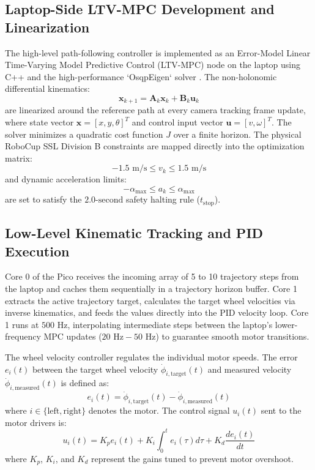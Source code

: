 \documentclass[a4paper,twoside,12pt]{report}
\begin{document}
\subsection{Laptop-Side LTV-MPC Development and Linearization}

The high-level path-following controller is implemented as an Error-Model Linear Time-Varying Model Predictive Control (LTV-MPC) node on the laptop using C++ and the high-performance `OsqpEigen` solver \citep{pacheco2015testing,stellato2020osqp}. The non-holonomic differential kinematics:
\begin{equation}
\mathbf{x}_{k+1} = \mathbf{A}_k \mathbf{x}_k + \mathbf{B}_k \mathbf{u}_k
\label{eq:ltv_system}
\end{equation}
are linearized around the reference path at every camera tracking frame update, where state vector $\mathbf{x} = [x, y, \theta]^T$ and control input vector $\mathbf{u} = [v, \omega]^T$. The solver minimizes a quadratic cost function $J$ over a finite horizon. The physical RoboCup SSL Division B constraints are mapped directly into the optimization matrix:
\begin{equation}
-1.5\text{ m/s} \le v_k \le 1.5\text{ m/s}
\label{eq:velocity_constraint}
\end{equation}
and dynamic acceleration limits:
\begin{equation}
-\alpha_{\text{max}} \le a_k \le \alpha_{\text{max}}
\label{eq:acceleration_constraint}
\end{equation}
are set to satisfy the $2.0\text{-second}$ safety halting rule ($t_{\text{stop}}$).

\subsection{Low-Level Kinematic Tracking and PID Execution}

Core 0 of the Pico receives the incoming array of 5 to 10 trajectory steps from the laptop and caches them sequentially in a trajectory horizon buffer. Core 1 extracts the active trajectory target, calculates the target wheel velocities via inverse kinematics, and feeds the values directly into the PID velocity loop. Core 1 runs at $500\text{ Hz}$, interpolating intermediate steps between the laptop's lower-frequency MPC updates ($20\text{ Hz} - 50\text{ Hz}$) to guarantee smooth motor transitions.

The wheel velocity controller regulates the individual motor speeds. The error $e_i(t)$ between the target wheel velocity $\dot{\phi}_{i, \text{target}}(t)$ and measured velocity $\dot{\phi}_{i, \text{measured}}(t)$ is defined as:
\begin{equation}
e_i(t) = \dot{\phi}_{i, \text{target}}(t) - \dot{\phi}_{i, \text{measured}}(t)
\label{eq:wheel_error}
\end{equation}
where $i \in \{\text{left}, \text{right}\}$ denotes the motor. The control signal $u_i(t)$ sent to the motor drivers is:
\begin{equation}
u_i(t) = K_p e_i(t) + K_i \int_{0}^{t} e_i(\tau) d\tau + K_d \frac{de_i(t)}{dt}
\label{eq:motor_pid}
\end{equation}
where $K_p$, $K_i$, and $K_d$ represent the gains tuned to prevent motor overshoot.
\end{document}
